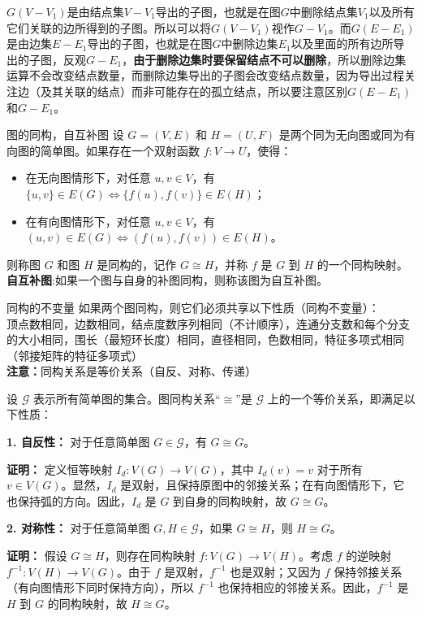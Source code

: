 $G(V-V_1)$是由结点集$V-V_1$导出的子图，也就是在图$G$中删除结点集$V_1$以及所有它们关联的边所得到的子图。所以可以将$G(V-V_1)$视作$G-V_1$。而$G(E-E_1)$是由边集$E-E_1$导出的子图，也就是在图$G$中删除边集$E_1$以及里面的所有边所导出的子图，反观$G-E_1$，\textbf{由于删除边集时要保留结点不可以删除}，所以删除边集运算不会改变结点数量，而删除边集导出的子图会改变结点数量，因为导出过程关注边（及其关联的结点）而非可能存在的孤立结点，所以要注意区别$G(E-E_1)$和$G-E_1$。
\begin{definition}{图的同构，自互补图}{}
设 $G = (V, E)$ 和 $H = (U, F)$ 是两个同为无向图或同为有向图的简单图。如果存在一个双射函数 $f: V \to U$，使得：
\begin{itemize}
    \item 在无向图情形下，对任意 $u, v \in V$，有 $\{u, v\} \in E(G) \iff \{f(u), f(v)\} \in E(H)$；
    \item 在有向图情形下，对任意 $u, v \in V$，有 $(u,v) \in E(G) \iff (f(u), f(v)) \in E(H)$。
\end{itemize}
则称图 $G$ 和图 $H$ 是同构的，记作 $G \cong H$，并称 $f$ 是 $G$ 到 $H$ 的一个同构映射。\\
\textbf{自互补图}:如果一个图与自身的补图同构，则称该图为自互补图。
\end{definition}
\begin{theorem}{同构的不变量}{}
如果两个图同构，则它们必须共享以下性质（同构不变量）：\\
顶点数相同，边数相同，结点度数序列相同（不计顺序），连通分支数和每个分支的大小相同，围长（最短环长度）相同，直径相同，色数相同，特征多项式相同（邻接矩阵的特征多项式）\\
\textbf{注意：}同构关系是等价关系（自反、对称、传递）
\end{theorem}
设 $\mathcal{G}$ 表示所有简单图的集合。图同构关系“$\cong$”是 $\mathcal{G}$ 上的一个等价关系，即满足以下性质：

\textbf{1. 自反性：} 对于任意简单图 $G \in \mathcal{G}$，有 $G \cong G$。

\textbf{证明：}
定义恒等映射 $I_d: V(G) \to V(G)$，其中 $I_d(v) = v$ 对于所有 $v \in V(G)$。显然，$I_d$ 是双射，且保持原图中的邻接关系；在有向图情形下，它也保持弧的方向。因此，$I_d$ 是 $G$ 到自身的同构映射，故 $G \cong G$。

\textbf{2. 对称性：} 对于任意简单图 $G, H \in \mathcal{G}$，如果 $G \cong H$，则 $H \cong G$。

\textbf{证明：}
假设 $G \cong H$，则存在同构映射 $f: V(G) \to V(H)$。考虑 $f$ 的逆映射 $f^{-1}: V(H) \to V(G)$。由于 $f$ 是双射，$f^{-1}$ 也是双射；又因为 $f$ 保持邻接关系（有向图情形下同时保持方向），所以 $f^{-1}$ 也保持相应的邻接关系。因此，$f^{-1}$ 是 $H$ 到 $G$ 的同构映射，故 $H \cong G$。

